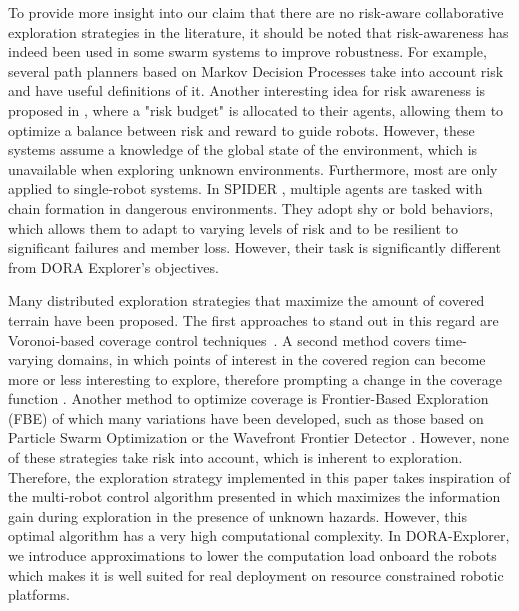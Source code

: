 \documentclass[letterpaper, 10 pt, conference]{ieeeconf}
\begin{document}
To provide more insight into our claim that there are no risk-aware collaborative exploration strategies in  the literature, it should be noted that risk-awareness has indeed been used in some swarm systems to improve robustness. For example, several path planners based on Markov Decision Processes \cite{undurti2010online,thiebaux2016rao,xiao2020robot} take into account risk and have useful definitions of it. Another interesting idea for risk awareness is proposed in \cite{ono2008efficient,vitus2011feedback}, where a "risk budget" is allocated to their agents, allowing them to optimize a balance between risk and reward to guide robots. However, these systems assume a knowledge of the global state of the environment, which is unavailable when exploring unknown environments. Furthermore, most are only applied to single-robot systems. In SPIDER \cite{hunt2020spider}, multiple agents are tasked with chain formation in dangerous environments. They adopt shy or bold behaviors, which allows them to adapt to varying levels of risk and to be resilient to significant failures and member loss. However, their task is significantly different from DORA Explorer's objectives.

Many distributed exploration strategies that maximize the amount of
covered terrain have been proposed. The first approaches to stand out
in this regard are Voronoi-based coverage control
techniques~\cite{luo2019voronoi,santos2019decentralized}. A second
method covers time-varying domains, in which points of interest in the
covered region can become more or less interesting to explore,
therefore prompting a change in the coverage function
\cite{santos2019decentralized,xu2019multi}. Another method to optimize
coverage is Frontier-Based Exploration (FBE)
\cite{yamauchi1998frontier} of which many variations have been
developed, such as those based on Particle Swarm Optimization
\cite{wang2011frontier} or the Wavefront Frontier Detector
\cite{topiwala2018frontier}. However, none of these strategies take
risk into account, which is inherent to exploration.  Therefore, the
exploration strategy implemented in this paper takes inspiration of
the multi-robot control algorithm presented in
\cite{dames2012decentralized,schwagerMultirobotControlPolicy2017}
which maximizes the information gain during exploration in the
presence of unknown hazards. However, this optimal algorithm has a
very high computational complexity. In DORA-Explorer, we introduce
approximations to lower the computation load onboard the robots which
makes it is well suited for real deployment on resource constrained
robotic platforms.
\end{document}
